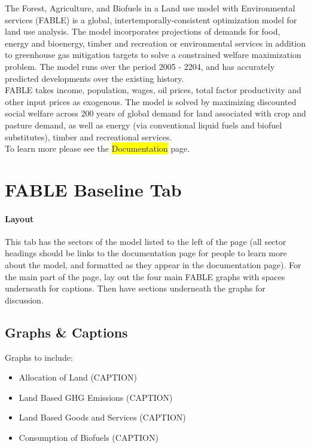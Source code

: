 \documentclass[10pt]{article}
\newcommand{\hilight}[1]{\colorbox{yellow}{#1}}
\begin{document}
The Forest, Agriculture, and Biofuels in a Land use model with Environmental services (FABLE) is a global, intertemporally-consistent optimization model for land use analysis. The model incorporates projections of demands for food, energy and bioenergy, timber and recreation or environmental services in addition to greenhouse gas mitigation targets to solve a constrained welfare maximization problem. The model runs over the period 2005 - 2204, and has accurately predicted developments over the existing history. \\
FABLE takes income, population, wages, oil prices, total factor productivity and other input prices as exogenous. The model is solved by maximizing discounted social welfare across 200 years of global demand for land associated with crop and pasture demand, as well as energy (via conventional liquid fuels and biofuel substitutes), timber and recreational services. \\
To learn more please see the \hilight{Documentation} page.



\section{FABLE Baseline Tab}
\paragraph{Layout}
This tab has the sectors of the model listed to the left of the page (all sector headings should be links to the documentation page for people to learn more about the model, and formatted as they appear in the documentation page). For the main part of the page, lay out the four main FABLE graphs with spaces underneath for captions. Then have sections underneath the graphs for discussion. 

\subsection{Graphs \& Captions}
Graphs to include:
\begin{itemize}
\item Allocation of Land (CAPTION)
\item Land Based GHG Emissions (CAPTION)
\item Land Based Goods and Services (CAPTION)
\item Consumption of Biofuels (CAPTION)
\end{itemize}
\end{document}
